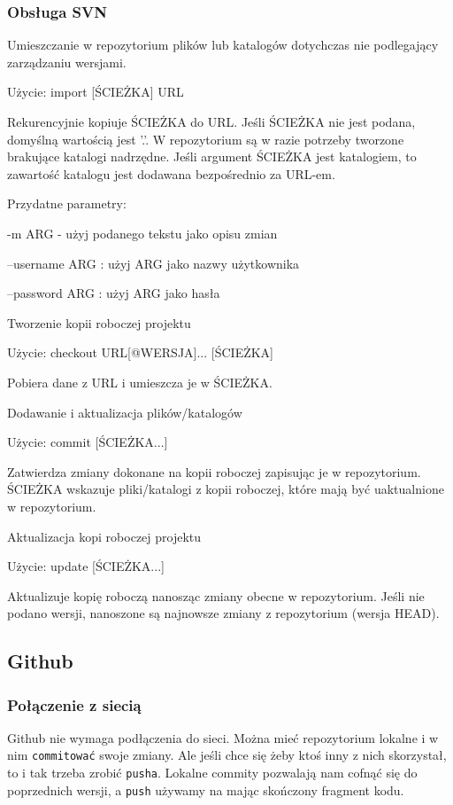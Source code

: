 \subsubsection{Obsługa SVN}
Umieszczanie w repozytorium plików lub katalogów dotychczas nie podlegający zarządzaniu wersjami.

Użycie: import [ŚCIEŻKA] URL

Rekurencyjnie kopiuje ŚCIEŻKA do URL. Jeśli ŚCIEŻKA nie jest podana, domyślną wartością jest '.'. W repozytorium są w razie potrzeby tworzone brakujące katalogi nadrzędne. Jeśli argument ŚCIEŻKA jest katalogiem, to zawartość katalogu jest dodawana bezpośrednio za URL-em.

Przydatne parametry:

-m ARG  -  użyj podanego tekstu jako opisu zmian

--username ARG  : użyj ARG jako nazwy użytkownika

--password ARG  : użyj ARG jako hasła

Tworzenie kopii roboczej projektu

Użycie: checkout URL[@WERSJA]... [ŚCIEŻKA]

Pobiera dane z URL i umieszcza je w ŚCIEŻKA.

Dodawanie i aktualizacja plików/katalogów

Użycie: commit [ŚCIEŻKA...]

Zatwierdza zmiany dokonane na kopii roboczej zapisując je w repozytorium. ŚCIEŻKA wskazuje pliki/katalogi z kopii roboczej, które mają być uaktualnione w repozytorium.

Aktualizacja kopi roboczej projektu

Użycie: update [ŚCIEŻKA...]

Aktualizuje kopię roboczą nanosząc zmiany obecne w repozytorium.  Jeśli nie podano wersji, nanoszone są najnowsze zmiany z  repozytorium (wersja HEAD).

\subsection{Github}
\subsubsection{Połączenie z siecią}
Github nie wymaga podłączenia do sieci. Można mieć repozytorium lokalne i w nim \verb|commitować| swoje zmiany. Ale jeśli chce się żeby ktoś inny z nich skorzystał, to i tak trzeba zrobić \verb|pusha|. Lokalne commity pozwalają nam cofnąć się do poprzednich wersji, a \verb|push| używamy na mając skończony fragment kodu. 

